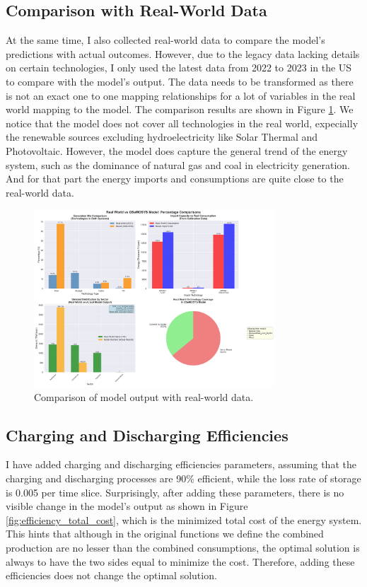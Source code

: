 \documentclass[11pt]{article}
\begin{document}
\subsection{Comparison with Real-World Data}
At the same time, I also collected real-world data to compare the model's predictions with actual outcomes. However, due to the legacy data lacking details on certain technologies, I only used the latest data from 2022 to 2023 in the US to compare with the model's output. The data needs to be transformed as there is not an exact one to one mapping relationships for a lot of variables in the real world mapping to the model. The comparison results are shown in Figure \ref{fig:real_world_comparison}. We notice that the model does not cover all technologies in the real world, expecially the renewable sources excluding hydroelectricity like Solar Thermal and Photovoltaic. However, the model does capture the general trend of the energy system, such as the dominance of natural gas and coal in electricity generation. And for that part the energy imports and consumptions are quite close to the real-world data.


\begin{figure}[H]
    \centering
    \includegraphics[width=0.8\textwidth]{comparison_output/real_world_vs_model_comparison.png}
    \caption{Comparison of model output with real-world data.}
    \label{fig:real_world_comparison}
\end{figure}

\subsection{Charging and Discharging Efficiencies}
I have added charging and discharging efficiencies parameters, assuming that the charging and discharging processes are 90\% efficient, while the loss rate of storage is 0.005 per time slice. Surprisingly, after adding these parameters, there is no visible change in the model's output as shown in Figure \ref{fig:efficiency_total_cost}, which is the minimized total cost of the energy system. This hints that although in the original functions we define the combined production are no lesser than the combined consumptions, the optimal solution is always to have the two sides equal to minimize the cost. Therefore, adding these efficiencies does not change the optimal solution.
\end{document}
